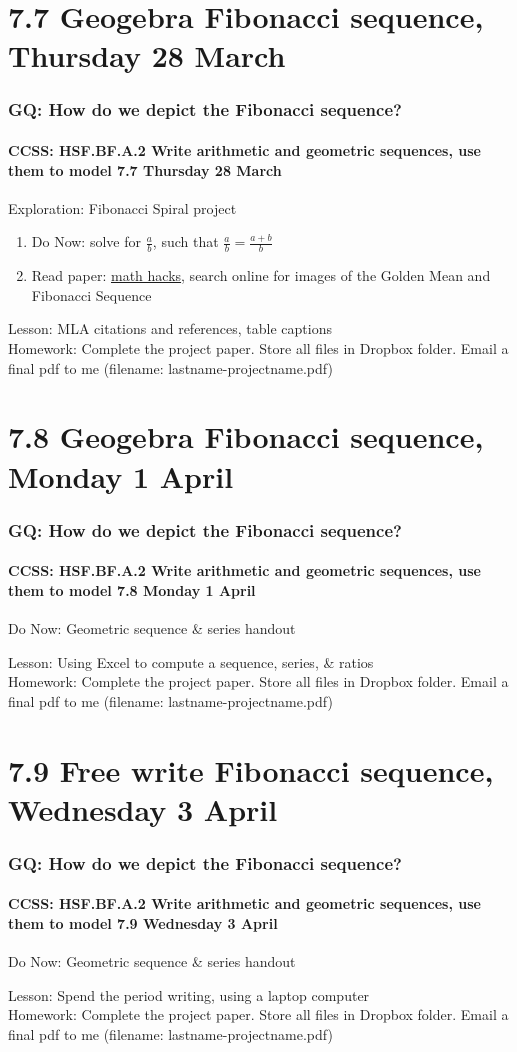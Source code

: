 \documentclass{beamer}
\begin{document}
\section{7.7 Geogebra Fibonacci sequence, Thursday 28 March}
  \frame
  {
    \frametitle{GQ: How do we depict the Fibonacci sequence?}
    \framesubtitle{CCSS: HSF.BF.A.2 Write arithmetic and geometric sequences, use them to model \hfill \alert{7.7 Thursday 28 March}}

    \begin{block}{Exploration: Fibonacci Spiral project}
      \begin{enumerate}
        \item Do Now: solve for $\frac{a}{b}$, such that $\frac{a}{b}=\frac{a+b}{b}$
        \item Read paper: \href{
        https://medium.com/i-math/what-is-the-golden-ratio-d3cc17c8fefd}{math hacks}, search online for images of the Golden Mean and Fibonacci Sequence
    \end{enumerate}
    \end{block}
    Lesson: MLA citations and references, table captions \\
    Homework: Complete the project paper. Store all files in Dropbox folder. Email a final pdf to me (filename: lastname-projectname.pdf)
  }

  \section{7.8 Geogebra Fibonacci sequence, Monday 1 April}
    \frame
    {
      \frametitle{GQ: How do we depict the Fibonacci sequence?}
      \framesubtitle{CCSS: HSF.BF.A.2 Write arithmetic and geometric sequences, use them to model \hfill \alert{7.8 Monday 1 April}}

      \begin{block}{Do Now: Geometric sequence \& series handout}
      \end{block}
      Lesson: Using Excel to compute a sequence, series, \& ratios\\
      Homework: Complete the project paper. Store all files in Dropbox folder. Email a final pdf to me (filename: lastname-projectname.pdf)
    }

  \section{7.9 Free write Fibonacci sequence, Wednesday 3 April}
    \frame
    {
      \frametitle{GQ: How do we depict the Fibonacci sequence?}
      \framesubtitle{CCSS: HSF.BF.A.2 Write arithmetic and geometric sequences, use them to model \hfill \alert{7.9 Wednesday 3 April}}

      \begin{block}{Do Now: Geometric sequence \& series handout}
      \end{block}
      Lesson: Spend the period writing, using a laptop computer\\
      Homework: Complete the project paper. Store all files in Dropbox folder. Email a final pdf to me (filename: lastname-projectname.pdf)
    }
\end{document}
